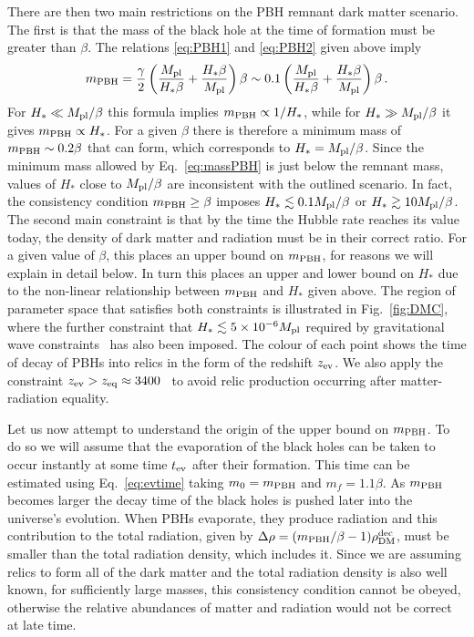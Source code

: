 \documentclass[reprint,amsmath,amssymbGaps,onecolumn,notitlepage,nofootinbib]{revtex4-1}
\newcommand{\mpl}{M_{\rm pl}}
\begin{document}
There are then two main restrictions 
on the PBH remnant dark matter scenario. 
The first is that the mass 
of the black hole 
at the time of 
formation must be greater than $\beta$.
The relations \eqref{eq:PBH1} and \eqref{eq:PBH2} given above imply 
\begin{equation}
m_{\rm PBH} = \frac{\gamma}{2} \left(\frac{\mpl}{H_* \beta} + \frac{H_* \beta}{\mpl} \right) \beta \sim 0.1 \left(\frac{\mpl}{H_* \beta} + \frac{H_* \beta}{\mpl} \right) \beta\,.
\label{eq:massPBH}
\end{equation}
 For $H_*\ll \mpl/\beta$ this formula implies $m_{\rm PBH} \propto 1/H_*$, while  for $H_*\gg \mpl/\beta$ it gives $m_{\rm PBH} \propto H_*$. For a given $\beta$ there is therefore a minimum mass of $m_{\rm PBH} \sim 0.2 \beta$ that can form, which corresponds to $H_* = \mpl/\beta$.  Since the minimum mass allowed by Eq.~\eqref{eq:massPBH} is just below the remnant mass, values of $H_*$ close to $\mpl/\beta$ are inconsistent with the outlined scenario. %
 In fact, the consistency condition $m_{\rm PBH}\geq \beta$ imposes $H_* \lesssim 0.1 \mpl/\beta$ or $H_* \gtrsim 10 \mpl/\beta$.
The second main constraint is that by the time the Hubble rate reaches its value today, the density 
of dark matter and radiation must be in their correct ratio. For a given value of $\beta$, this places an upper bound on $m_{\rm PBH}$, for reasons we will explain in detail below. In turn this places an upper and lower bound on $H_*$ due to the non-linear relationship between
$m_{\rm PBH}$ and $H_*$ given above. 
The region of parameter space that satisfies both constraints is illustrated in Fig.~\ref{fig:DMC}, where the further constraint that $H_* \lesssim 5\times 10^{-6} \mpl$ required by gravitational 
wave constraints~\cite{Akrami:2018odb} has also been imposed. The colour of each point shows the time of decay of PBHs into relics in the form of the redshift $z_{\rm ev}$. We also apply the constraint $z_{\rm ev}>z_{\rm eq}\approx 3400$~\cite{Aghanim:2018eyx} to avoid relic production occurring after matter-radiation equality.

Let us now attempt to understand the 
origin of the upper
bound on $m_{\rm PBH}$. To do so we will 
assume that the 
evaporation of the black holes can 
be taken to occur instantly at some time $t_{\rm ev}$ after their formation. This time 
can be estimated using Eq.~\eqref{eq:evtime} taking $m_0 = m_{\rm PBH}$ and $m_f = 1.1 \beta$.
As $m_{\rm PBH}$ becomes larger the decay time of the black holes is pushed later into 
the universe's evolution. When PBHs evaporate, they produce radiation and this contribution to the total radiation, given by $\Delta \rho = (m_{\rm PBH}/\beta -1)\rho_{{\rm DM}}^{\rm dec}$, must be smaller than the total radiation density, which includes it. Since we are assuming relics to form all of the dark matter and the total radiation density is also well known, for sufficiently large masses, this consistency condition cannot be obeyed, otherwise the relative abundances of matter and radiation would not be correct at late time.
\end{document}
